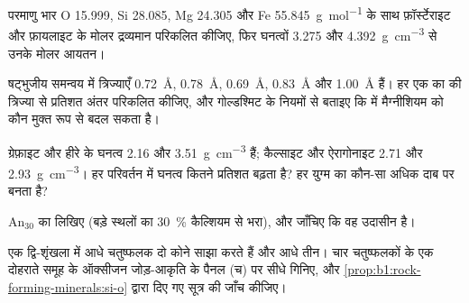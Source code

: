\begin{exercise}[$\star$]\label{exo:b1:rock-forming-minerals:2}
परमाणु भार O \num{15.999}, Si \num{28.085}, Mg \num{24.305} और Fe \qty{55.845}{g.mol^{-1}} के साथ फ़ॉर्स्टेराइट और
फ़ायलाइट के मोलर द्रव्यमान परिकलित कीजिए, फिर घनत्वों \num{3.275} और \qty{4.392}{g.cm^{-3}} से उनके मोलर आयतन।

\end{exercise}

\begin{exercise}[$\star$]\label{exo:b1:rock-forming-minerals:3}
षट्भुजीय समन्वय में त्रिज्याएँ  \qty{0.72}{\angstrom},  \qty{0.78}{\angstrom}, 
\qty{0.69}{\angstrom},  \qty{0.83}{\angstrom} और  \qty{1.00}{\angstrom} हैं। हर एक का
 की त्रिज्या से प्रतिशत अंतर परिकलित कीजिए, और गोल्डश्मिट के नियमों से बताइए कि  में मैग्नीशियम को
कौन मुक्त रूप से बदल सकता है।

\end{exercise}

\begin{exercise}[$\star$]\label{exo:b1:rock-forming-minerals:4}
ग्रेफ़ाइट और हीरे के घनत्व \num{2.16} और \qty{3.51}{g.cm^{-3}} हैं; कैल्साइट और ऐरागोनाइट \num{2.71} और
\qty{2.93}{g.cm^{-3}}। हर परिवर्तन में घनत्व कितने प्रतिशत बढ़ता है? हर युग्म का कौन-सा  अधिक दाब पर बनता है?

\end{exercise}

\begin{exercise}[$\star\star$]\label{exo:b1:rock-forming-minerals:5}
 $\text{An}_{30}$ का  लिखिए (बड़े स्थलों का \qty{30}{\percent} कैल्शियम से भरा), और जाँचिए
कि वह उदासीन है।
\end{exercise}

\begin{exercise}[$\star\star$]\label{exo:b1:rock-forming-minerals:6}
एक द्वि-शृंखला में आधे चतुष्फलक दो कोने साझा करते हैं और आधे तीन। चार चतुष्फलकों के एक दोहराते समूह के ऑक्सीजन
जोड़-आकृति के पैनल (च) पर सीधे गिनिए, और \cref{prop:b1:rock-forming-minerals:si-o} द्वारा दिए गए सूत्र
 की जाँच कीजिए।
\end{exercise}

